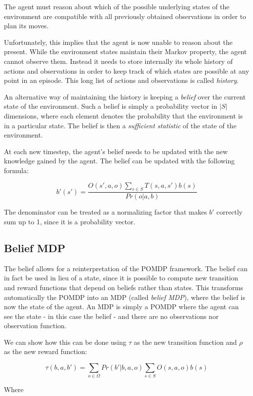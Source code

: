 The agent must reason about which of the possible underlying states of the environment are
compatible with all previously obtained observations in order to plan its moves.

Unfortunately, this implies that the agent is now unable to reason about the present. While the
environment states maintain their Markov property, the agent cannot observe them. Instead it needs
to store internally its whole history of actions and observations in order to keep track of which
states are possible at any point in an episode. This long list of actions and observations is called
\textit{history}.

An alternative way of maintaining the history is keeping a \textit{belief} over the current state of
the environment. Such a belief is simply a probability vector in $|S|$ dimensions, where each
element denotes the probability that the environment is in a particular state. The belief is then a
\textit{sufficient statistic} of the state of the environment.

At each new timestep, the agent's belief needs to be updated with the new knowledge gained by the
agent. The belief can be updated with the following formula:

\[ b'(s') = \frac{O(s', a, o)\sum_{s\in S}T(s,a,s')b(s)}{Pr(o|a,b)} \]

The denominator can be treated as a normalizing factor that makes $b'$ correctly sum up to 1, since
it is a probability vector.

\subsection{Belief MDP}

The belief allows for a reinterpretation of the POMDP framework. The belief can in fact be used in
lieu of a state, since it is possible to compute new transition and reward functions that depend on
beliefs rather than states. This transforms automatically the POMDP into an MDP (called
\textit{belief MDP}), where the belief is now the state of the agent. An MDP is simply a POMDP where
the agent can see the state - in this case the belief - and there are no observations nor
observation function.

We can show how this can be done using $\tau$ as the new transition function and $\rho$ as the new
reward function:

\[ \tau(b,a,b') = \sum_{o\in \Omega} Pr(b' | b, a, o) \sum_{s\in S} O(s,a,o) b(s) \]

Where

